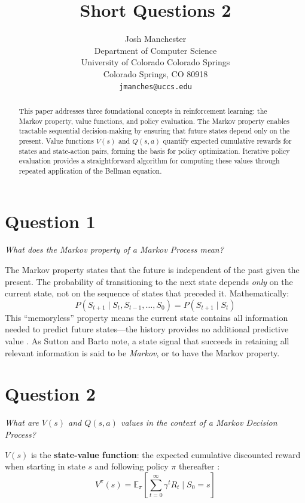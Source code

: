 \documentclass[letterpaper]{article}
\title{Short Questions 2}
\author{
    Josh Manchester\\
    Department of Computer Science\\
    University of Colorado Colorado Springs\\
    Colorado Springs, CO 80918\\
    \texttt{jmanches@uccs.edu}
}
\begin{document}
\maketitle

\begin{abstract}
This paper addresses three foundational concepts in reinforcement learning: the Markov property, value functions, and policy evaluation. The Markov property enables tractable sequential decision-making by ensuring that future states depend only on the present. Value functions $V(s)$ and $Q(s,a)$ quantify expected cumulative rewards for states and state-action pairs, forming the basis for policy optimization. Iterative policy evaluation provides a straightforward algorithm for computing these values through repeated application of the Bellman equation.
\end{abstract}

\section*{Question 1}
\textit{What does the Markov property of a Markov Process mean?}

\vspace{0.5em}

The Markov property states that the future is independent of the past given the present. The probability of transitioning to the next state depends \textit{only} on the current state, not on the sequence of states that preceded it. Mathematically:
\[
P(S_{t+1} \mid S_t, S_{t-1}, \ldots, S_0) = P(S_{t+1} \mid S_t)
\]
This ``memoryless'' property means the current state contains all information needed to predict future states---the history provides no additional predictive value \citep{sutton2018reinforcement}. As Sutton and Barto note, a state signal that succeeds in retaining all relevant information is said to be \textit{Markov}, or to have the Markov property.

\section*{Question 2}
\textit{What are $V(s)$ and $Q(s, a)$ values in the context of a Markov Decision Process?}

\vspace{0.5em}

$V(s)$ is the \textbf{state-value function}: the expected cumulative discounted reward when starting in state $s$ and following policy $\pi$ thereafter \citep{sutton2018reinforcement}:
\[
V^\pi(s) = \mathbb{E}_\pi\left[\sum_{t=0}^{\infty} \gamma^t R_t \mid S_0 = s\right]
\]
\end{document}
